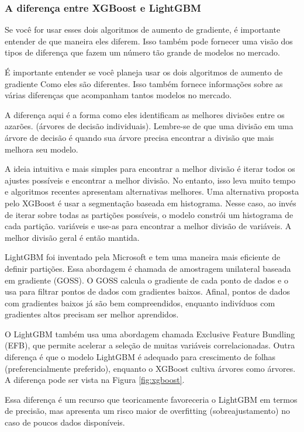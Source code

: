 \subsubsection{A diferen\c ca entre XGBoost e LightGBM}

Se você for usar esses dois algoritmos de aumento de gradiente, é importante entender de
que maneira eles diferem. Isso também pode fornecer uma visão dos tipos de diferença que fazem um número tão grande de modelos no mercado.

É importante entender se você planeja usar os dois algoritmos de aumento de gradiente
Como eles são diferentes. Isso também fornece informações sobre as várias diferenças que acompanham tantos modelos no mercado.

A diferença aqui é a forma como eles identificam as melhores divisões entre os azarões. (árvores de decisão individuais). Lembre-se de que uma divisão em uma árvore de decisão é quando sua árvore precisa encontrar a divisão que mais melhora seu modelo.

A ideia intuitiva e mais simples para encontrar a melhor divisão é iterar todos os ajustes possíveis e encontrar a melhor divisão. No entanto, isso leva muito tempo e algoritmos recentes apresentam alternativas melhores.
Uma alternativa proposta pelo XGBoost é usar a segmentação baseada em histograma. Nesse caso, ao invés de iterar sobre todas as partições possíveis, o modelo constrói um histograma de cada partição.
variáveis e use-as para encontrar a melhor divisão de variáveis. A melhor divisão geral é então mantida.

LightGBM foi inventado pela Microsoft e tem uma maneira mais eficiente de definir partições. Essa abordagem é chamada de amostragem unilateral baseada em gradiente (GOSS). O GOSS calcula o gradiente de cada ponto de dados e o usa para filtrar pontos de dados com gradientes baixos. Afinal, pontos de dados com gradientes baixos já são bem compreendidos, enquanto indivíduos com gradientes altos precisam ser melhor aprendidos.

O LightGBM também usa uma abordagem chamada Exclusive Feature Bundling (EFB), que permite acelerar a seleção de muitas variáveis correlacionadas. Outra diferença é que o modelo LightGBM é adequado para crescimento de folhas (preferencialmente preferido), enquanto o XGBoost cultiva árvores como árvores. A diferença pode ser vista na Figura \ref{fig:xgboost}.

Essa diferença é um recurso que teoricamente favoreceria o LightGBM em termos de precisão, mas apresenta um risco maior de overfitting (sobreajustamento) no caso de poucos dados disponíveis.

